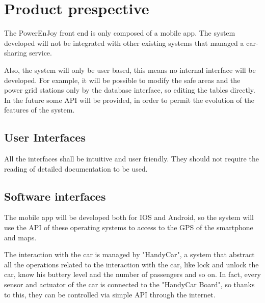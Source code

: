 \section{Product prespective}

The PowerEnJoy front end is only composed of a mobile app.
The system developed will not be integrated with other existing systems that managed a car-sharing service.

Also, the system will only be user based, this means no internal interface will be developed.
For example, it will be possible to modify the safe areas and the power grid stations only by the database interface, so editing the tables directly.
In the future some API will be provided, in order to permit the evolution of the features of the system.

\subsection{User Interfaces}
All the interfaces shall be intuitive and user friendly. They should not
require the reading of detailed documentation to be used.

\subsection{Software interfaces}
The mobile app will be developed both for IOS and Android, so the system will use the API of these operating systems to access to the GPS of the smartphone and maps.

The interaction with the car is managed by "HandyCar", a system that abstract all the operations related to the interaction with the car, like lock and unlock the car, know his buttery level and the number of passengers and so on.
In fact, every sensor and actuator of the car is connected to the "HandyCar Board", so thanks to this, they can be controlled via simple API through the internet.

